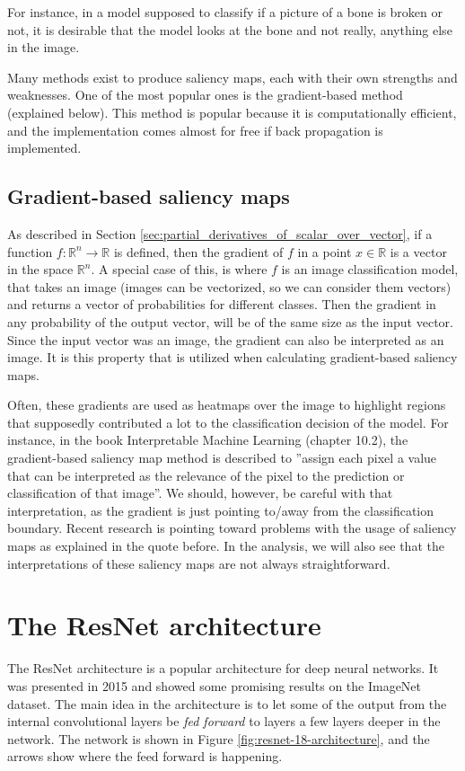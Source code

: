 For instance, in a model supposed to classify if a picture of a bone is broken or not,
it is desirable that the model looks at the bone and not really, anything else in the image.

Many methods exist to produce saliency maps, each with their own strengths and weaknesses.
One of the most popular ones is the gradient-based method (explained below).
This method is popular because it is computationally efficient,
and the implementation comes almost for free if back propagation is implemented.

\subsection{Gradient-based saliency maps} \label{sec:gradiant_saliency_maps}
As described in Section \ref{sec:partial_derivatives_of_scalar_over_vector},
if a function $f: \mathbb{R}^n \rightarrow \mathbb{R}$ is defined,
then the gradient of $f$ in a point $x\in\mathbb{R}$ is a vector in the space $\mathbb{R}^n$.
A special case of this, is where $f$ is an image classification model, that takes
an image (images can be vectorized, so we can consider them vectors) and returns a vector of probabilities for
different classes.
Then the gradient in any probability of the output vector, will be of the same size as the input vector.
Since the input vector was an image, the gradient can also be interpreted as an image.
It is this property that is utilized when calculating gradient-based saliency maps.

Often, these gradients are used as heatmaps over the image to highlight regions that
supposedly contributed a lot to the classification decision of the model.
For instance, in the book Interpretable Machine Learning (chapter 10.2)\cite{interpretable-machine-learning}, the gradient-based
saliency map method is described to
''assign each pixel a value that can be interpreted as the relevance of the pixel to the prediction or classification of that image''.
We should, however, be careful with that interpretation, as the gradient is just pointing to/away from the classification boundary.
Recent research is pointing toward problems with the usage of saliency maps as explained in the quote before\cite{false-hope}.
In the analysis, we will also see that the interpretations of these saliency maps are not always straightforward.

\section{The ResNet architecture}
The ResNet architecture is a popular architecture for deep neural networks.
It was presented in 2015 and showed some promising results on the ImageNet dataset\cite{RESNET-paper}.
The main idea in the architecture is to let some of the output from the internal convolutional layers
be \textit{fed forward} to layers a few layers deeper in the network.
The network is shown in Figure \ref{fig:resnet-18-architecture},
and the arrows show where the feed forward is happening.

